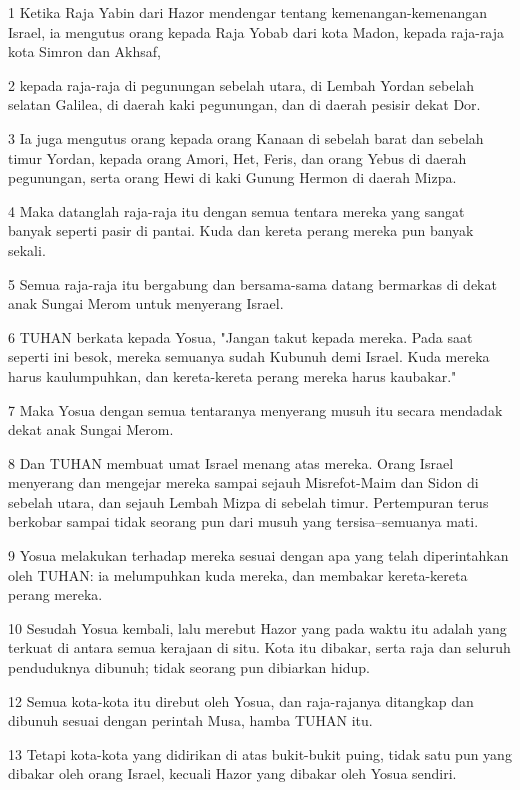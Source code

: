 \par 1 Ketika Raja Yabin dari Hazor mendengar tentang kemenangan-kemenangan Israel, ia mengutus orang kepada Raja Yobab dari kota Madon, kepada raja-raja kota Simron dan Akhsaf,
\par 2 kepada raja-raja di pegunungan sebelah utara, di Lembah Yordan sebelah selatan Galilea, di daerah kaki pegunungan, dan di daerah pesisir dekat Dor.
\par 3 Ia juga mengutus orang kepada orang Kanaan di sebelah barat dan sebelah timur Yordan, kepada orang Amori, Het, Feris, dan orang Yebus di daerah pegunungan, serta orang Hewi di kaki Gunung Hermon di daerah Mizpa.
\par 4 Maka datanglah raja-raja itu dengan semua tentara mereka yang sangat banyak seperti pasir di pantai. Kuda dan kereta perang mereka pun banyak sekali.
\par 5 Semua raja-raja itu bergabung dan bersama-sama datang bermarkas di dekat anak Sungai Merom untuk menyerang Israel.
\par 6 TUHAN berkata kepada Yosua, "Jangan takut kepada mereka. Pada saat seperti ini besok, mereka semuanya sudah Kubunuh demi Israel. Kuda mereka harus kaulumpuhkan, dan kereta-kereta perang mereka harus kaubakar."
\par 7 Maka Yosua dengan semua tentaranya menyerang musuh itu secara mendadak dekat anak Sungai Merom.
\par 8 Dan TUHAN membuat umat Israel menang atas mereka. Orang Israel menyerang dan mengejar mereka sampai sejauh Misrefot-Maim dan Sidon di sebelah utara, dan sejauh Lembah Mizpa di sebelah timur. Pertempuran terus berkobar sampai tidak seorang pun dari musuh yang tersisa--semuanya mati.
\par 9 Yosua melakukan terhadap mereka sesuai dengan apa yang telah diperintahkan oleh TUHAN: ia melumpuhkan kuda mereka, dan membakar kereta-kereta perang mereka.
\par 10 Sesudah Yosua kembali, lalu merebut Hazor yang pada waktu itu adalah yang terkuat di antara semua kerajaan di situ. Kota itu dibakar, serta raja dan seluruh penduduknya dibunuh; tidak seorang pun dibiarkan hidup.
\par 12 Semua kota-kota itu direbut oleh Yosua, dan raja-rajanya ditangkap dan dibunuh sesuai dengan perintah Musa, hamba TUHAN itu.
\par 13 Tetapi kota-kota yang didirikan di atas bukit-bukit puing, tidak satu pun yang dibakar oleh orang Israel, kecuali Hazor yang dibakar oleh Yosua sendiri.
